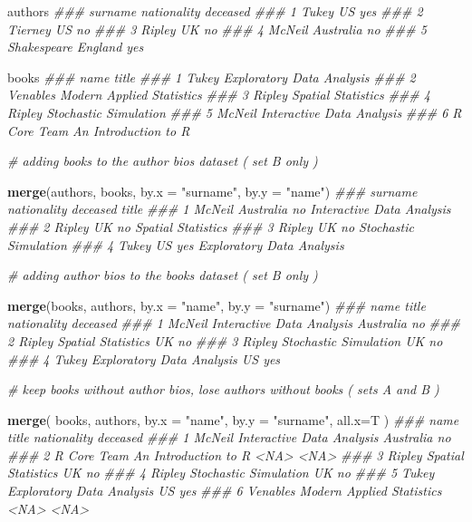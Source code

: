 \documentclass[]{book}
\newenvironment{Shaded}{\begin{snugshade}}{\end{snugshade}}
\newcommand{\CommentTok}[1]{\textcolor[rgb]{0.56,0.35,0.01}{\textit{#1}}}
\newcommand{\DataTypeTok}[1]{\textcolor[rgb]{0.13,0.29,0.53}{#1}}
\newcommand{\KeywordTok}[1]{\textcolor[rgb]{0.13,0.29,0.53}{\textbf{#1}}}
\newcommand{\NormalTok}[1]{#1}
\newcommand{\StringTok}[1]{\textcolor[rgb]{0.31,0.60,0.02}{#1}}
\theoremstyle{definition}
\theoremstyle{definition}
\theoremstyle{definition}
\theoremstyle{remark}
\begin{document}
\begin{Shaded}
\begin{Highlighting}[]
\NormalTok{authors   }
\CommentTok{###       surname nationality deceased}
\CommentTok{### 1       Tukey          US      yes}
\CommentTok{### 2     Tierney          US       no}
\CommentTok{### 3      Ripley          UK       no}
\CommentTok{### 4      McNeil   Australia       no}
\CommentTok{### 5 Shakespeare     England      yes}

\NormalTok{books    }
\CommentTok{###          name                     title}
\CommentTok{### 1       Tukey Exploratory Data Analysis}
\CommentTok{### 2    Venables Modern Applied Statistics}
\CommentTok{### 3      Ripley        Spatial Statistics}
\CommentTok{### 4      Ripley     Stochastic Simulation}
\CommentTok{### 5      McNeil Interactive Data Analysis}
\CommentTok{### 6 R Core Team      An Introduction to R}


\CommentTok{# adding books to the author bios dataset  ( set B only )}

\KeywordTok{merge}\NormalTok{(authors, books, }\DataTypeTok{by.x =} \StringTok{"surname"}\NormalTok{, }\DataTypeTok{by.y =} \StringTok{"name"}\NormalTok{)    }
\CommentTok{###   surname nationality deceased                     title}
\CommentTok{### 1  McNeil   Australia       no Interactive Data Analysis}
\CommentTok{### 2  Ripley          UK       no        Spatial Statistics}
\CommentTok{### 3  Ripley          UK       no     Stochastic Simulation}
\CommentTok{### 4   Tukey          US      yes Exploratory Data Analysis}



\CommentTok{# adding author bios to the books dataset  ( set B only )}

\KeywordTok{merge}\NormalTok{(books, authors, }\DataTypeTok{by.x =} \StringTok{"name"}\NormalTok{, }\DataTypeTok{by.y =} \StringTok{"surname"}\NormalTok{)    }
\CommentTok{###     name                     title nationality deceased}
\CommentTok{### 1 McNeil Interactive Data Analysis   Australia       no}
\CommentTok{### 2 Ripley        Spatial Statistics          UK       no}
\CommentTok{### 3 Ripley     Stochastic Simulation          UK       no}
\CommentTok{### 4  Tukey Exploratory Data Analysis          US      yes}



\CommentTok{# keep books without author bios, lose authors without books  ( sets A and B )}

\KeywordTok{merge}\NormalTok{( books, authors, }\DataTypeTok{by.x =} \StringTok{"name"}\NormalTok{, }\DataTypeTok{by.y =} \StringTok{"surname"}\NormalTok{, }\DataTypeTok{all.x=}\NormalTok{T )     }
\CommentTok{###          name                     title nationality deceased}
\CommentTok{### 1      McNeil Interactive Data Analysis   Australia       no}
\CommentTok{### 2 R Core Team      An Introduction to R        <NA>     <NA>}
\CommentTok{### 3      Ripley        Spatial Statistics          UK       no}
\CommentTok{### 4      Ripley     Stochastic Simulation          UK       no}
\CommentTok{### 5       Tukey Exploratory Data Analysis          US      yes}
\CommentTok{### 6    Venables Modern Applied Statistics        <NA>     <NA>}




\end{Highlighting}
\end{Shaded}
\end{document}
